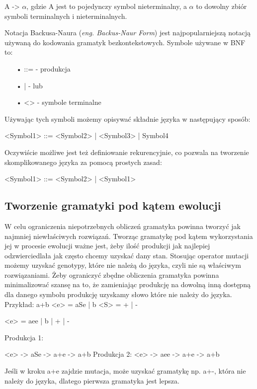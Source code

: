 	A -> {$\alpha$}, \newline
gdzie A jest to pojedynczy symbol nieterminalny, a $\alpha$ to dowolny zbiór symboli terminalnych i nieterminalnych.
	
Notacja Backusa-Naura (\textit{eng. Backus-Naur Form}) jest najpopularniejszą notacją używaną do kodowania gramatyk bezkontekstowych. Symbole używane w BNF to:

\begin{itemize}
  \item[•] ::= - produkcja
  \item[•] |   - lub
  \item[•] <>  - symbole terminalne
\end{itemize}

Używając tych symboli możemy opisywać składnie języka w następujący sposób:

 <Symbol1> ::= <Symbol2> | <Symbol3> | Symbol4
 
Oczywiście możliwe jest też definiowanie rekurencyjnie, co pozwala na tworzenie skomplikowanego języka za pomocą prostych zasad: 

	 <Symbol1> ::= <Symbol2> | <Symbol1>

\subsection{Tworzenie gramatyki pod kątem ewolucji}

W celu ograniczenia niepotrzebnych obliczeń gramatyka powinna tworzyć jak najmniej niewłaściwych rozwiązań. 
Tworząc gramatykę pod kątem wykorzystania jej w procesie ewolucji ważne jest, żeby ilość produkcji jak najlepiej odzwierciedlała jak często chcemy uzyskać dany stan.
Stosując operator mutacji możemy uzyskać genotypy, które nie należą do języka, czyli nie są właściwym rozwiązaniami. Żeby ograniczyć zbędne obliczenia gramatyka powinna minimalizować szansę na to, że zamieniając produkcję na dowolną inną dostępną dla danego symbolu produkcję uzyskamy słowo które nie należy do języka.
Przykład:
a+b
<e> = aSe | b
<S> = + | -

<e> = aee | b | + | -

Produkcja 1:

<e> -> aSe -> a+e -> a+b
Produkcja 2:
<e> -> aee -> a+e -> a+b

Jeśli w kroku a+e zajdzie mutacja, może uzyskać gramatykę np. a+-, która nie należy do języka, dlatego pierwsza gramatyka jest lepsza.



